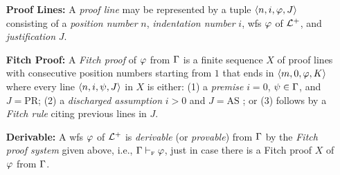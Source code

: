 \documentclass[a4paper, 11pt]{article} %
\begin{document}
\begin{enumerate}
  \item[\bf Proof Lines:] A \textit{proof line} may be represented by a tuple $\langle n,i,\varphi,J\rangle$ consisting of a \textit{position number} $n$, \textit{indentation number} $i$, wfs $\varphi$ of $\mathcal{L}^+$, and \textit{justification} $J$. %
  \item[\bf Fitch Proof:] A \textit{Fitch proof} of $\varphi$ from $\Gamma$ is a finite sequence $X$ of proof lines with consecutive position numbers starting from $1$ that ends in $\langle m,0,\varphi,K\rangle$ where every line $\langle n,i,\psi,J\rangle$ in $X$ is either: (1) a \textit{premise} $i = 0$, $\psi \in \Gamma$, and $J = \text{PR}$; (2) a \textit{discharged assumption} $i > 0$ and $J = \text{AS}$ ; or (3) follows by a \textit{Fitch rule} citing previous lines in $J$. 
  \item[\bf Derivable:]
    A wfs $\varphi$ of $\mathcal{L}^+$ is \textit{derivable} (or \textit{provable}) from $\Gamma$ by the \textit{Fitch proof system} given above, i.e., $\Gamma \vdash_{\textsc{f}} \varphi$, just in case there is a Fitch proof $X$ of $\varphi$ from $\Gamma$.
\end{enumerate}
\end{document}

